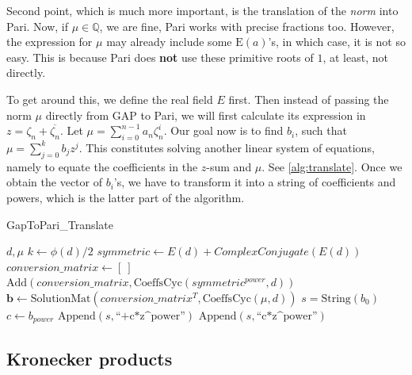 \documentclass[11pt]{article}
\begin{document}
Second point, which is much more important, is the translation of the \textit{norm}
into Pari. Now, if $\mu \in \mathbb{Q}$, we are fine, Pari works with precise
fractions too. However, the expression for $\mu$ may already include some
$\text{E}(a)$'s, in which case, it is not so easy. This is because Pari does
\textbf{not} use these primitive roots of $1$, at least, not directly.

To get around this, we define the real field $E$ first. Then instead of passing the
norm $\mu$ directly from GAP to Pari, we will first calculate its expression in
$z = \zeta_n + \overline{\zeta_n}$. Let $\mu = \sum_{i = 0}^{n-1} a_n \zeta_n^i$.
Our goal now is to find $b_i$, such that $\mu = \sum_{j = 0}^{k} b_j z^j$.
This constitutes solving another linear system of equations, namely to equate the
coefficients in the $z$-sum and $\mu$. See \cref{alg:translate}. Once we obtain
the vector of $b_i$'s, we have to transform it into a string of coefficients and
powers, which is the latter part of the algorithm.

\begin{algorithm}
  \caption{GapToPari\_Translate}
  \label{alg:translate}
  \begin{algorithmic}
    \State $d, \mu$
    \State $k \gets \phi(d) / 2$ 
    \State $symmetric \gets E(d) + ComplexConjugate(E(d))$
    \State $conversion\_matrix \gets [~]$
      \State $\text{Add}(conversion\_matrix, \text{CoeffsCyc}(symmetric^{power}, d))$
    \EndFor
    \State $\mathbf{b} \gets \text{SolutionMat}(conversion\_matrix^T, \text{CoeffsCyc}(\mu, d))$
    \State $s = \text{String}(b_0)$
      \State $c \gets b_{power}$
        \State $\text{Append}(s, \text{``+c*z^power''})$
        \State $\text{Append}(s, \text{``c*z^power''})$ 
      \EndIf
    \EndFor
  \end{algorithmic}
\end{algorithm}

\subsection{Kronecker products} \label{sec:kronecker}
\end{document}
